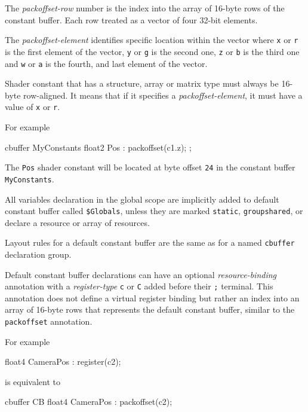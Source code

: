 \p The \textit{packoffset-row} number is the index into the array of 16-byte
rows of the constant buffer. Each row treated as a vector of four 32-bit
elements.

\p The \textit{packoffset-element} identifies specific location within the
vector where \texttt{x} or \texttt{r} is the first element of the vector,
\texttt{y} or \texttt{g} is the second one, \texttt{z} or \texttt{b} is the
third one and \texttt{w} or \texttt{a} is the fourth, and last element of the
vector.

\p Shader constant that has a structure, array or matrix type must always be
16-byte row-aligned. It means that if it specifies a
\textit{packoffset-element}, it must have a value of \texttt{x} or \texttt{r}.

\p For example

\begin{HLSL}
  cbuffer MyConstants {
    float2 Pos : packoffset(c1.z);
  };
\end{HLSL}

The \texttt{Pos} shader constant will be located at byte offset \texttt{24} in
the constant buffer \texttt{MyConstants}.


\p All variables declaration in the global scope are implicitly added to default
constant buffer called \texttt{\$Globals}, unless they are marked
\texttt{static}, \texttt{groupshared}, or declare a resource or array of
resources.

\p Layout rules for a default constant buffer are the same as for a named
\texttt{cbuffer} declaration group.

\p Default constant buffer declarations can have an optional
\textit{resource-binding} annotation with a \textit{register-type} \texttt{c} or
\texttt{C} added before their \texttt{;} terminal. This annotation does not
define a virtual register binding but rather an index into an array of 16-byte
rows that represents the default constant buffer, similar to the
\texttt{packoffset} annotation.

\p For example
\begin{HLSL}
  float4 CameraPos : register(c2);
\end{HLSL}

is equivalent to

\begin{HLSL}
  cbuffer CB {
    float4 CameraPos : packoffset(c2);
  }
\end{HLSL}

